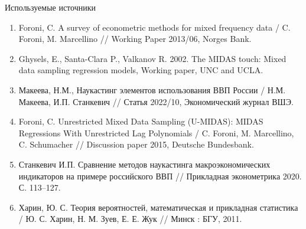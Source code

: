 \documentclass[notheorems, 10pt]{beamer}
\begin{document}

\begin{frame}
	{Используемые источники}
	\begin{enumerate}
	\item Foroni, C. A survey of econometric methods for mixed frequency data / C. Foroni, M. Marcellino // Working Paper 2013/06, Norges Bank.
	\item Ghysels, E., Santa-Clara P., Valkanov R. 2002. The MIDAS touch: Mixed data sampling regression models, Working paper, UNC and UCLA.
	\item Макеева, Н.М., Наукастинг элементов использования ВВП России / Н.М. Макеева, И.П. Станкевич // Статья 2022/10, Экономический журнал ВШЭ.
	\item Foroni, C. Unrestricted Mixed Data Sampling (U-MIDAS): MIDAS Regressions With Unrestricted Lag Polynomials / C. Foroni, M. Marcellino, C. Schumacher // Discussion paper 2015, Deutsche Bundesbank.
	\item Станкевич И.П. Сравнение методов наукастинга макроэкономических индикаторов на примере российского ВВП // Прикладная эконометрика 2020. С. 113–127.
	\item Харин, Ю. С. Теория вероятностей, математическая и прикладная статистика / Ю. С. Харин, Н. М. Зуев, Е. Е. Жук // Минск : БГУ, 2011. 
	\end{enumerate}
\end{frame}
\end{document}
